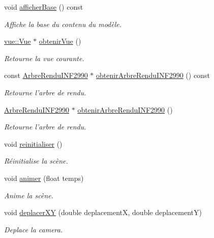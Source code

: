 \begin{DoxyCompactItemize}
void \hyperlink{group__inf2990_ga23bed5e3b226e446cfee30084150f7f7}{afficher\-Base} () const 
\begin{DoxyCompactList}\small\item\em Affiche la base du contenu du modèle. \end{DoxyCompactList}\item 
\hyperlink{classvue_1_1_vue}{vue\-::\-Vue} $\ast$ \hyperlink{group__inf2990_gaa56cf96b7e381e0f14e2c9a55be913bf}{obtenir\-Vue} ()
\begin{DoxyCompactList}\small\item\em Retourne la vue courante. \end{DoxyCompactList}\item 
const \hyperlink{class_arbre_rendu_i_n_f2990}{Arbre\-Rendu\-I\-N\-F2990} $\ast$ \hyperlink{group__inf2990_gaf578161d03b2157cdaa3182900ff61cc}{obtenir\-Arbre\-Rendu\-I\-N\-F2990} () const 
\begin{DoxyCompactList}\small\item\em Retourne l'arbre de rendu. \end{DoxyCompactList}\item 
\hyperlink{class_arbre_rendu_i_n_f2990}{Arbre\-Rendu\-I\-N\-F2990} $\ast$ \hyperlink{group__inf2990_ga12d5594db6a9507b24c7e1ffcd6751af}{obtenir\-Arbre\-Rendu\-I\-N\-F2990} ()
\begin{DoxyCompactList}\small\item\em Retourne l'arbre de rendu. \end{DoxyCompactList}\item 
void \hyperlink{group__inf2990_ga4c2a991fe2297e44eeee0de111fb08d2}{reinitialiser} ()
\begin{DoxyCompactList}\small\item\em Réinitialise la scène. \end{DoxyCompactList}\item 
void \hyperlink{group__inf2990_ga24dcb4e32cf104797158b398bafbfbb7}{animer} (float temps)
\begin{DoxyCompactList}\small\item\em Anime la scène. \end{DoxyCompactList}\item 
void \hyperlink{group__inf2990_ga1d0468d14d18990c39861b22d4921a7c}{deplacer\-X\-Y} (double deplacement\-X, double deplacement\-Y)
\begin{DoxyCompactList}\small\item\em Deplace la camera. \end{DoxyCompactList}\item 

\end{DoxyCompactItemize}
